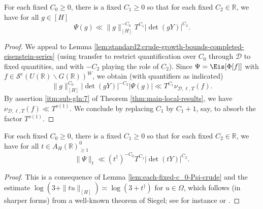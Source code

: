 \begin{lemma}\label{lem:each-fixed-c_0-Psi-crude}
  For each fixed $C_0 \geq 0$, there is a fixed $C_1 \geq 0$ so that for each fixed $C_2 \in \mathbb{R}$, we have for all $g \in [H]$
  \begin{equation*}
    \Psi(g)
    \ll
    \|g\|_{[H]}^{-C_0}
    T^{C_1}
    \left\lvert \det(g Y) \right\rvert^{C_2}.
  \end{equation*}
\end{lemma}
\begin{proof}
  We appeal to Lemma \ref{lem:standard2:crude-growth-bounds-completed-eisenstein-series} (using transfer to restrict quantification over $C_0$ through $\mathcal{D}$ to fixed quantities, and with $-C_2$ playing the role of $C_2$).  Since $\Psi = \Eis[\Phi[f]]$ with $f \in \mathcal{S}^e(U(\mathbb{R}) \backslash G(\mathbb{R}))^W$, we obtain (with quantifiers as indicated)
  \begin{equation*}
    \|g\|_{[H]}^{C_0} \left\lvert \det(g Y) \right\rvert^{-C_2} \left\lvert \Psi(g) \right\rvert \ll T^{C_1} \nu_{\mathcal{D},\ell,T}(f).
  \end{equation*}
  By assertion \eqref{itm:sub-gln:7} of Theorem \ref{thm:main-local-results}, we have $\nu_{\mathcal{D},\ell,T}(f) \ll T^{o(1)}$.  We conclude by replacing $C_1$ by $C_1 + 1$, say, to absorb the factor $T^{o(1)}$.
\end{proof}

\begin{lemma}\label{lem:standard2:each-fixed-c_0}
  For each fixed $C_0 \geq 0$, there is a fixed $C_1 \geq 0$ so that for each fixed $C_2 \in \mathbb{R}$, we have for all $t \in A_H(\mathbb{R})^0_{\geq 1}$
  \begin{equation}\label{eq:psi-_t-ll}
    \|\Psi \|_t \ll (t^\dagger )^{-C_0} T^{C_1} |\det(t Y)|^{C_2}.
  \end{equation}
\end{lemma}
\begin{proof}
  This is a consequence of Lemma \ref{lem:each-fixed-c_0-Psi-crude} and the estimate $\log(3 + \|t u\|_{[H]}) \asymp \log(3 + t^\dagger)$ for $u \in \Omega$, which follows (in sharper forms) from a well-known theorem of Siegel; see for instance \cite[Lemma 2.1]{MR1001613} or \cite[A.1.1 (viii)]{2016arXiv160206538B}.
\end{proof}

